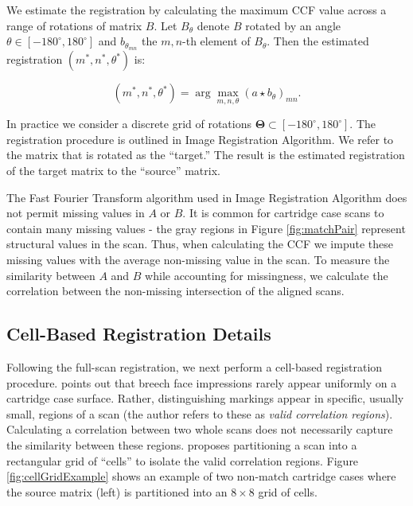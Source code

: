 \documentclass[11pt,]{isuthesis}
\begin{document}
We estimate the registration by calculating the maximum CCF value across a range of rotations of matrix \(B\).
Let \(B_\theta\) denote \(B\) rotated by an angle \(\theta \in [-180^\circ,180^\circ]\) and \(b_{\theta_{mn}}\) the \(m,n\)-th element of \(B_\theta\).
Then the estimated registration \((m^*,n^*,\theta^*)\) is:

\[
(m^*,n^*,\theta^*) = \arg \max_{m,n,\theta} (a \star b_\theta)_{mn}.
\]

In practice we consider a discrete grid of rotations \(\pmb{\Theta} \subset [-180^\circ,180^\circ]\).
The registration procedure is outlined in Image Registration Algorithm.
We refer to the matrix that is rotated as the ``target.''
The result is the estimated registration of the target matrix to the ``source'' matrix.

The Fast Fourier Transform algorithm used in Image Registration Algorithm does not permit missing values in \(A\) or \(B\).
It is common for cartridge case scans to contain many missing values - the gray regions in Figure \ref{fig:matchPair} represent structural values in the scan.
Thus, when calculating the CCF we impute these missing values with the average non-missing value in the scan.
To measure the similarity between \(A\) and \(B\) while accounting for missingness, we calculate the correlation between the non-missing intersection of the aligned scans.

\hypertarget{cell-based-registration-details}{%
\subsection{Cell-Based Registration Details}\label{cell-based-registration-details}}

Following the full-scan registration, we next perform a cell-based registration procedure.
\citet{song_proposed_2013} points out that breech face impressions rarely appear uniformly on a cartridge case surface.
Rather, distinguishing markings appear in specific, usually small, regions of a scan (the author refers to these as \emph{valid correlation regions}).
Calculating a correlation between two whole scans does not necessarily capture the similarity between these regions.
\citet{song_proposed_2013} proposes partitioning a scan into a rectangular grid of ``cells'' to isolate the valid correlation regions.
Figure \ref{fig:cellGridExample} shows an example of two non-match cartridge cases where the source matrix (left) is partitioned into an \(8 \times 8\) grid of cells.
\end{document}
